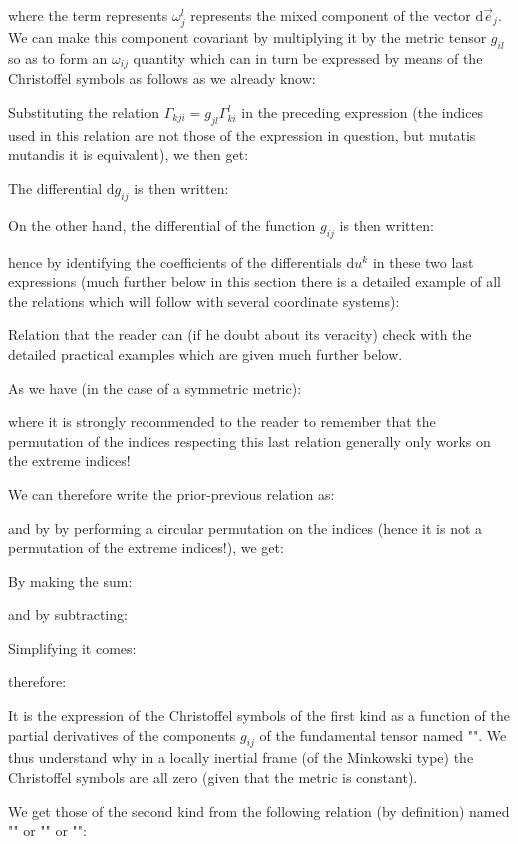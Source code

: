 	where the term represents $\omega_j^l$ represents the mixed component of the vector $\mathrm{d}\vec{e}_j$. We can make this component covariant by multiplying it by the metric tensor $g_{il}$ so as to form an $\omega_{ij}$ quantity which can in turn be expressed by means of the Christoffel symbols as follows as we already know:
	
	Substituting the relation $\Gamma_{kji}=g_{jl}\Gamma_{ki}^l$ in the preceding expression (the indices used in this relation are not those of the expression in question, but mutatis mutandis it is equivalent), we then get:
	
	The differential $\mathrm{d}g_{ij}$ is then written:
	
	On the other hand, the differential of the function $g_{ij}$ is then written:
	
	hence by identifying the coefficients of the differentials $\mathrm{d}u^k$ in these two last expressions (much further below in this section there is a detailed example of all the relations which will follow with several coordinate systems):
	
	Relation that the reader can (if he doubt about its veracity) check with the detailed practical examples which are given much further below.

	As we have (in the case of a symmetric metric):
	
	where it is strongly recommended to the reader to remember that the permutation of the indices respecting this last relation generally only  works on the extreme indices!

	We can therefore write the prior-previous relation as:
	
	and by by performing a circular permutation on the indices (hence it is not a permutation of the extreme indices!), we get:
	
	By making the sum:
	
	and by subtracting:
	
	Simplifying it comes:
	
	therefore:
	
	It is the expression of the Christoffel symbols of the first kind as a function of the partial derivatives of the components $g_{ij}$ of the fundamental tensor named "". We thus understand why in a locally inertial frame (of the Minkowski type) the Christoffel symbols are all zero (given that the metric is constant).
	
	We get those of the second kind from the following relation (by definition) named "" or "" or "":
	
